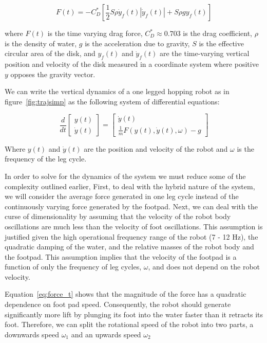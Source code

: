 \begin{equation}
	F(t) = - C_D^* \left[\frac{1}{2} S \rho \dot{y}_f(t) |\dot{y}_f(t) | + S \rho g y_f(t) \right]
	\label{eq:force_t}
\end{equation}

\noindent where $F(t)$ is the time varying drag force, $C_D^* \approx 0.703$ is the drag coefficient, $\rho$ is the density of water, $g$ is the acceleration due to gravity, $S$ is the effective circular area of the disk, and $y_f(t)$ and $\dot{y}_f(t)$ are the time-varying vertical position and velocity of the disk measured in a coordinate system where positive $y$ opposes the gravity vector. 

We can write the vertical dynamics of a one legged hopping robot as in figure~\ref{fig:trajsimp} as the following system of differential equations:

\begin{equation}
	\frac{d}{dt} \begin{bmatrix} y(t) \\ \dot{y}(t) \end{bmatrix} = \begin{bmatrix} \dot{y}(t) \\ \frac{1}{m} F(y(t),\dot{y}(t), \omega) - g \end{bmatrix} 
    \label{eq:eom}
\end{equation}

\noindent Where $y(t)$ and $\dot{y}(t)$ are the position and velocity of the robot and $\omega$ is the frequency of the leg cycle. 

In order to solve for the dynamics of the system we must reduce some of the complexity outlined earlier, First, to deal with the hybrid nature of the system, we will consider the average force generated in one leg cycle instead of the continuously varying force generated by the footpad. Next, we can deal with the curse of dimensionality by assuming that the velocity of the robot body oscillations are much less than the velocity of foot oscillations. This assumption is justified given the high operational frequency range of the robot (7 - 12 Hz), the quadratic damping of the water, and the relative masses of the robot body and the footpad. This assumption implies that the velocity of the footpad is a function of only the frequency of leg cycles, $\omega$, and does not depend on the robot velocity.

Equation~\ref{eq:force_t} shows that the magnitude of the force has a quadratic dependence on foot pad speed. Consequently, the robot should generate significantly more lift by plunging its foot into the water faster than it retracts its foot. Therefore, we can split the rotational speed of the robot into two parts, a downwards speed $\omega_1$ and an upwards speed $\omega_2$

